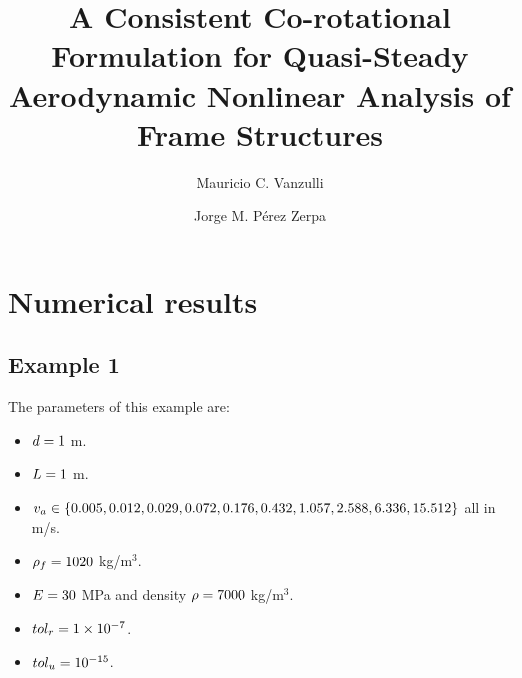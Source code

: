 \documentclass[3p,a4paper,11pt,review]{elsarticle}
\begin{document}
	
	
	\begin{frontmatter}
		
		\title{A Consistent Co-rotational Formulation for Quasi-Steady Aerodynamic Nonlinear Analysis of Frame Structures}
		
		\author[1]{Mauricio C. Vanzulli}
		\author[2]{Jorge M. Pérez Zerpa}
		
		\address[1]{Instituto de Ingeniería Mecánica y Producción Industrial, Facultad de Ingeniería, Universidad de la República, Montevideo, Uruguay}
		
		\address[2]{Instituto de Estructuras y Transporte, Facultad de Ingeniería, Universidad de la República, Montevideo, Uruguay}  
		
	\end{frontmatter}


\section{Numerical results}


\subsection{Example 1}



The parameters of this example are:

\begin{itemize}
	\item $d= 1$ m.
	\item $L = 1$ m.
	\item $v_a \in \{ 0.005, 0.012, 0.029, 0.072, 0.176, 0.432, 1.057, 2.588, 6.336, 15.512 \}$ all in m/s.
	\item $\rho_f = 1020$ kg/m$^3$.
	\item $E = 30$ MPa and density $\rho = 7000$ kg/m$^3$.
	\item $tol_r = 1\times 10^{-7}$.
	\item $tol_u = 10^{-15}$.
\end{itemize}
\end{document}
